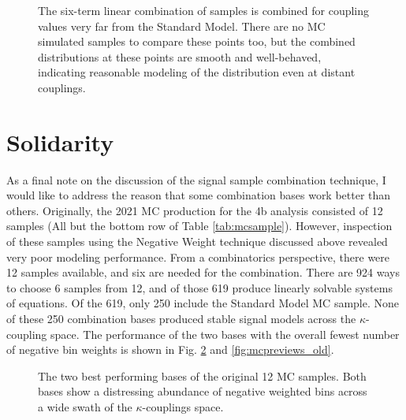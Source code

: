     \begin{figure}[tbh]
    	\centering
        \caption{
            The six-term linear combination of samples is combined for coupling values very far from the Standard Model.
            There are no MC simulated samples to compare these points too, but the combined distributions at these points are smooth and well-behaved,
                indicating reasonable modeling of the distribution even at distant couplings.
        }
        \label{fig:vbf_hh_preview}
    \end{figure}


\FloatBarrier
\section{Solidarity} \label{sec:solidarity}
    
    As a final note on the discussion of the signal sample combination technique,
        I would like to address the reason that some combination bases work better than others.
    Originally, the 2021 MC production for the 4b analysis consisted of 12 samples (All but the bottom row of Table \ref{tab:mcsample}).
    However, inspection of these samples using the Negative Weight technique discussed above revealed very poor modeling performance.
    From a combinatorics perspective, there were 12 samples available, and six are needed for the combination.
    There are 924 ways to choose 6 samples from 12, and of those 619 produce linearly solvable systems of equations.
    Of the 619, only 250 include the Standard Model MC sample.
    None of these 250 combination bases produced stable signal models across the $\kappa$-coupling space.
    The performance of the two bases with the overall fewest number of negative bin weights is shown in Fig. \ref{fig:mcnWeight_old} and \ref{fig:mcpreviews_old}.

    \begin{figure}[tbh]
    	\centering
        \caption{
            The two best performing bases of the original 12 MC samples.
            Both bases show a distressing abundance of negative weighted bins across a wide swath of the $\kappa$-couplings space.
        }
        \label{fig:mcnWeight_old}
    \end{figure}


